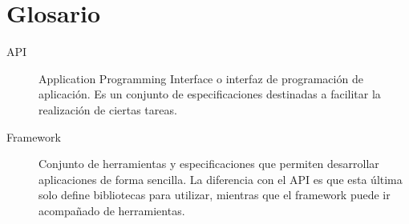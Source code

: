 \chapter{Glosario}

\begin{description}
	\item[API] Application Programming Interface o interfaz de programación de aplicación. Es un conjunto de especificaciones destinadas a facilitar la realización de ciertas tareas.
	
	\item[Framework] Conjunto de herramientas y especificaciones que permiten desarrollar aplicaciones de forma sencilla. La diferencia con el API es que esta última solo define bibliotecas para utilizar, mientras que el framework puede ir acompañado de herramientas.
\end{description}
